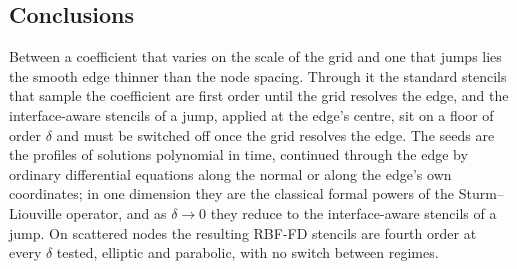 \documentclass[11pt]{amsart}
\theoremstyle{definition}
\theoremstyle{remark}
\begin{document}
\subsection{Conclusions}
\label{sec:conclusions}
Between a coefficient that varies on the scale of the grid and one that
jumps lies the smooth edge thinner than the node spacing. Through it the
standard stencils that sample the coefficient are first order until the
grid resolves the edge, and the interface-aware stencils of a jump, applied
at the edge's centre, sit on a floor of order $\delta$ and must be switched
off once the grid resolves the edge. The seeds are the profiles of
solutions polynomial in time, continued through the edge by ordinary
differential equations along the normal or along the edge's own
coordinates; in one dimension they are the classical formal powers of the
Sturm--Liouville operator, and as $\delta \to 0$ they reduce to the
interface-aware stencils of a jump. On scattered nodes the resulting RBF-FD
stencils are fourth order at every $\delta$ tested, elliptic and parabolic,
with no switch between regimes.
\end{document}
